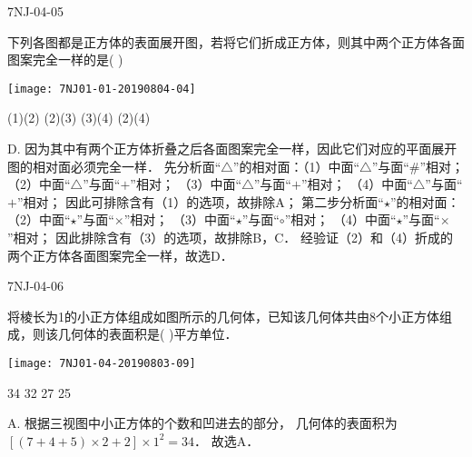 \begin{defproblem}{7NJ-04-05}%
\begin{onlyproblem}%
下列各图都是正方体的表面展开图，若将它们折成正方体，则其中两个正方体各面图案完全一样的是(    ) 
\begin{center}
\texttt{[image: 7NJ01-01-20190804-04]}
\end{center}

\xx
{(1)(2)}
{(2)(3)}
{(3)(4)}
{(2)(4)}

\end{onlyproblem}%
\begin{onlysolution}%
\begin{solution}%
D.
因为其中有两个正方体折叠之后各面图案完全一样，因此它们对应的平面展开图的相对面必须完全一样．
先分析面“$\triangle$”的相对面：（1）中面“$\triangle$”与面“\#”相对； （2）中面“$\triangle$”与面“$+$”相对； （3）中面“$\triangle$”与面“$+$”相对； （4）中面“$\triangle$”与面“$+$”相对； 因此可排除含有（1）的选项，故排除A；
第二步分析面“$\star$”的相对面： （2）中面“$\star$”与面“$\times$”相对； （3）中面“$\star$”与面“$\circ$”相对； （4）中面“$\star$”与面“$\times$”相对； 因此排除含有（3）的选项，故排除B，C． 经验证（2）和（4）折成的两个正方体各面图案完全一样，故选D．
\end{solution}%
\end{onlysolution}%
\end{defproblem}




\begin{defproblem}{7NJ-04-06}%
\begin{onlyproblem}%
将棱长为1的小正方体组成如图所示的几何体，已知该几何体共由8个小正方体组成，则该几何体的表面积是(    )平方单位． 
\begin{center}
\texttt{[image: 7NJ01-04-20190803-09]}
\end{center}

\xx
{34}
{32}
{27}
{25}

\end{onlyproblem}%
\begin{onlysolution}%
\begin{solution}%
A. 根据三视图中小正方体的个数和凹进去的部分， 几何体的表面积为$[(7+4+5) \times 2+2] \times 1^{2}=34$． 故选A． 
\end{solution}%
\end{onlysolution}%
\end{defproblem}





